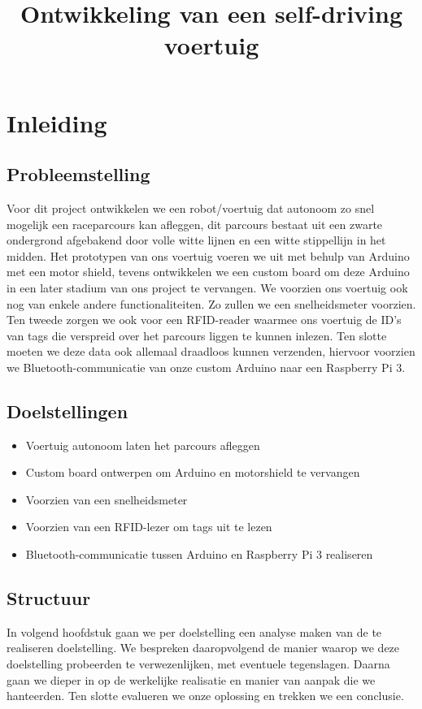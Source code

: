 \documentclass[11pt,a4paper]{report}
\title{Ontwikkeling van een self-driving voertuig}
\subtitle{}
\begin{document}
\preface
\tableofcontents

\chapter{Inleiding}
\section{Probleemstelling}
Voor dit project ontwikkelen we een robot/voertuig dat autonoom zo snel mogelijk een raceparcours kan afleggen, dit parcours bestaat uit een zwarte ondergrond afgebakend door volle witte lijnen en een witte stippellijn in het midden. Het prototypen van ons voertuig voeren we uit met behulp van Arduino met een motor shield, tevens ontwikkelen we een custom board om deze Arduino in een later stadium van ons project te vervangen. We voorzien ons voertuig ook nog van enkele andere functionaliteiten. Zo zullen we een snelheidsmeter voorzien. Ten tweede zorgen we ook voor een RFID-reader waarmee ons voertuig de ID's van tags die verspreid over het parcours liggen te kunnen inlezen. Ten slotte moeten we deze data ook allemaal draadloos kunnen verzenden, hiervoor voorzien we Bluetooth-communicatie van onze custom Arduino naar een Raspberry Pi 3.
\section{Doelstellingen}
\begin{itemize}
	\item Voertuig autonoom laten het parcours afleggen
	\item Custom board ontwerpen om Arduino en motorshield te vervangen
	\item Voorzien van een snelheidsmeter
	\item Voorzien van een RFID-lezer om tags uit te lezen
	\item Bluetooth-communicatie tussen Arduino en Raspberry Pi 3 realiseren
\end{itemize}
\section{Structuur}
In volgend hoofdstuk gaan we per doelstelling een analyse maken van de te realiseren doelstelling. We bespreken daaropvolgend de manier waarop we deze doelstelling probeerden te verwezenlijken, met eventuele tegenslagen. Daarna gaan we dieper in op de werkelijke realisatie en manier van aanpak die we hanteerden.
Ten slotte evalueren we onze oplossing en trekken we een conclusie.
\end{document}
